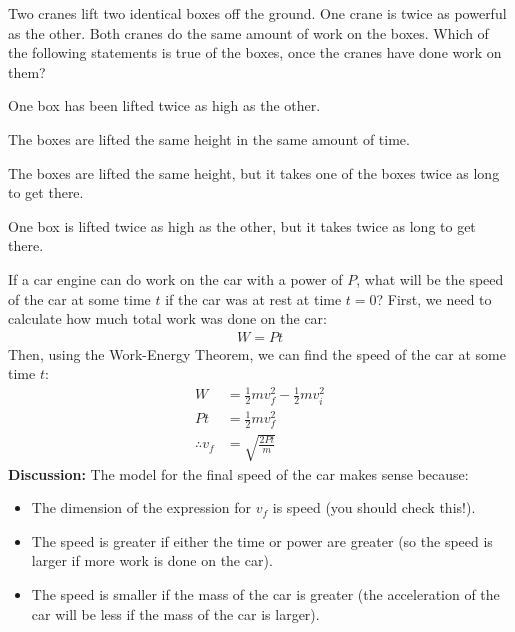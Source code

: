 \begin{checkpoint}
\begin{MCquestion}
{Two cranes lift two identical boxes off the ground. One crane is twice as powerful as the other. Both cranes do the same amount of work on the boxes. Which of the following statements is true of the boxes, once the cranes have done work on them?}
\item One box has been lifted twice as high as the other.
\item The boxes are lifted the same height in the same amount of time.
\item The boxes are lifted the same height, but it takes one of the boxes twice as long to get there. \correct
\item One box is lifted twice as high as the other, but it takes twice as long to get there. 
\end{MCquestion}
\end{checkpoint}
\newpage
\begin{example}{If a car engine can do work on the car with a power of $P$, what will be the speed of the car at some time $t$ if the car was at rest at time $t=0$?}
First, we need to calculate how much total work was done on the car:
\begin{align*}
W = P t
\end{align*}
Then, using the Work-Energy Theorem, we can find the speed of the car at some time $t$:
\begin{align*}
W &= \frac{1}{2}mv_f^2 - \frac{1}{2}mv_i^2\\
Pt &= \frac{1}{2}mv_f^2 \\
\therefore v_f &= \sqrt{\frac{2Pt}{m}}
\end{align*}
\textbf{Discussion:} The model for the final speed of the car makes sense because:
\begin{itemize}
\item The dimension of the expression for $v_f$ is speed (you should check this!).
\item The speed is greater if either the time or power are greater (so the speed is larger if more work is done on the car).
\item The speed is smaller if the mass of the car is greater (the acceleration of the car will be less if the mass of the car is larger).
\end{itemize}
\end{example}

